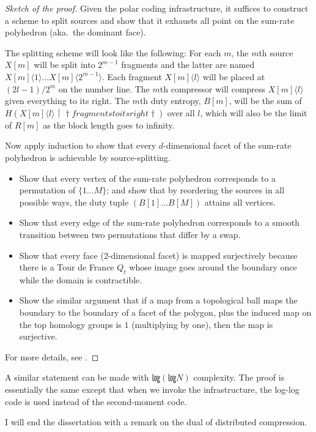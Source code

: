 \documentclass[openany]{amsbook}
\numberwithin{equation}{chapter}
\numberwithin{figure}{chapter}
\numberwithin{table}{chapter}
\theoremstyle{definition}	理dfn:Definition~?s			理exa:Example~?s
\theoremstyle{remark}		理cla:Claim~?s				理rem:Remark~?s
\begin{document}
	\begin{proof}[Sketch of the proof]
		Given the polar coding infrastructure, it suffices to
		construct a scheme to split sources and show that it exhausts
		all point on the sum-rate polyhedron (aka.\ the dominant face).
		
		The splitting scheme will look like the following:
		For each $m$, the $m$th source $X[m]$ will be split into $2^{m-1}$ fragments
		and the latter are named $X[m]⟨1⟩…X[m]⟨2^{m-1}⟩$.
		Each fragment $X[m]⟨l⟩$ will be placed at $(2l-1)/2^m$ on the number line.
		The $m$th compressor will compress $X[m]⟨l⟩$ given everything to its right.
		The $m$th duty entropy, $B[m]$, will be the sum of
		$H(X[m]⟨l⟩｜†fragments to its right†)$ over all $l$,
		which will also be the limit of $R[m]$ as the block length goes to infinity.
		
		Now apply induction to show that every $d$-dimensional facet
		of the sum-rate polyhedron is achievable by source-splitting.
		\begin{itemize}
			\item	Show that every vertex of the sum-rate polyhedron
					corresponds to a permutation of $\{1…M\}$;
					and show that by reordering the sources in all possible ways,
					the duty tuple $(B[1]…B[M])$ attains all vertices.
			\item	Show that every edge of the sum-rate polyhedron corresponds to
					a smooth transition between two permutations that differ by a swap.
			\item	Show that every face ($2$-dimensional facet) is mapped surjectively
					because there is a Tour de France $Q_t$ whose image
					goes around the boundary once while the domain is contractible.
			\item	Show the similar argument that if a map from a topological ball
					maps the boundary to the boundary of a facet of the polygon,
					plus the induced map on the top homology groups is $1$
					(multiplying by one), then the map is surjective.
		\end{itemize}
		For more details, see \cite{GRUW01}.
	\end{proof}
	
	A similar statement can be made with $㏒(㏒N)$ complexity.
	The proof is essentially the same except that when we invoke the infrastructure,
	the log-log code is used instead of the second-moment code.
	
	I will end the dissertation with a remark on the dual of distributed compression.
\end{document}
